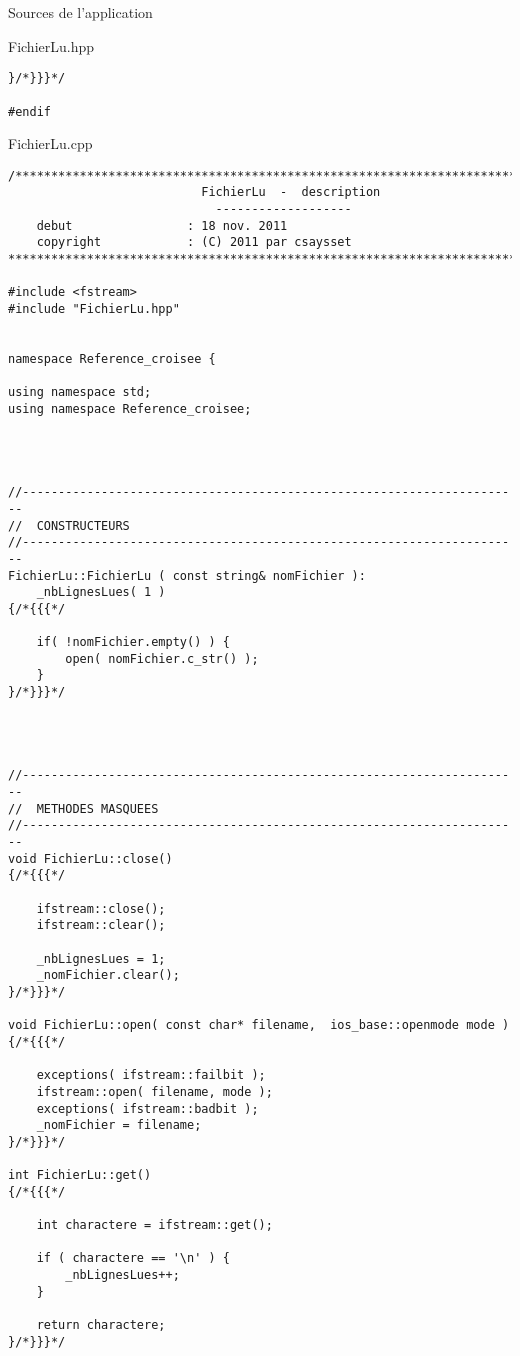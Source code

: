 \documentclass{article}
\begin{document}
\begin{section}{Sources de l'application}
\begin{paragraph}{FichierLu.hpp}
\begin{verbatim}
}/*}}}*/

#endif  
\end{verbatim}
  \end{paragraph}



\newpage
  \begin{paragraph}{FichierLu.cpp}
   \begin{verbatim}
/*************************************************************************
                           FichierLu  -  description
                             -------------------
    debut                : 18 nov. 2011
    copyright            : (C) 2011 par csaysset
*************************************************************************/

#include <fstream>
#include "FichierLu.hpp"


namespace Reference_croisee {

using namespace std;
using namespace Reference_croisee;




//----------------------------------------------------------------------
//  CONSTRUCTEURS
//----------------------------------------------------------------------
FichierLu::FichierLu ( const string& nomFichier ):
    _nbLignesLues( 1 )
{/*{{{*/

    if( !nomFichier.empty() ) {
        open( nomFichier.c_str() );
    }
}/*}}}*/




//----------------------------------------------------------------------
//  METHODES MASQUEES
//----------------------------------------------------------------------
void FichierLu::close()
{/*{{{*/

    ifstream::close();
    ifstream::clear();

    _nbLignesLues = 1;
    _nomFichier.clear();
}/*}}}*/

void FichierLu::open( const char* filename,  ios_base::openmode mode )
{/*{{{*/

    exceptions( ifstream::failbit );
    ifstream::open( filename, mode );
    exceptions( ifstream::badbit );
    _nomFichier = filename;
}/*}}}*/

int FichierLu::get()
{/*{{{*/

    int charactere = ifstream::get();

    if ( charactere == '\n' ) {
        _nbLignesLues++;
    }

    return charactere;
}/*}}}*/




\end{verbatim}
\end{paragraph}
\end{section}
\end{document}

